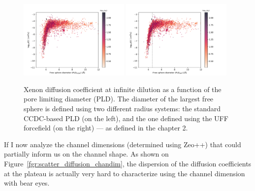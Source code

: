 \documentclass[main]{subfiles}
\begin{document}
\begin{figure}[ht]
  \centering
    \includegraphics[width=0.48\textwidth]{figures/5-diffusion/D_log-diameter_ccdc_colored_s_+.pdf}
    \includegraphics[width=0.48\textwidth]{figures/5-diffusion/D_log-diameter_colored_s_+.pdf}
    \caption{Xenon diffusion coefficient at infinite dilution as a function of the pore limiting diameter (PLD). The diameter of the largest free sphere is defined using two different radius systems: the standard CCDC-based PLD (on the left), and the one defined using the UFF forcefield (on the right)\autocite{Hung_2021} --- as defined in the chapter 2. }\label{fgr:diff_pld}
\end{figure}

If I now analyze the channel dimensions (determined using Zeo++) that could partially inform us on the channel shape. As shown on Figure~\ref{fgr:scatter_diffusion_chandim}, the dispersion of the diffusion coefficients at the plateau is actually very hard to characterize using the channel dimension with bear eyes. 
\end{document}
